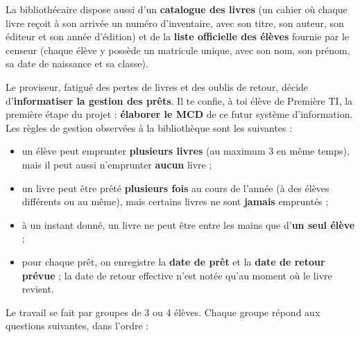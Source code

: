 \documentclass[11pt]{article}
\newcounter{popsec}
\newcounter{popsub}
\newcommand{\courssub}[1]{%
  \stepcounter{popsub}%
  \par\vspace{9pt}\noindent{\popxbold\fontsize{11.5}{13}\selectfont\color{popink}{\color{poporange}\thepopsec.\thepopsub}\hspace{6pt}#1}\par\nopagebreak\vspace{4pt}
}
\begin{document}
La bibliothécaire dispose aussi d'un \textbf{catalogue des livres} (un cahier où chaque livre reçoit à son arrivée un numéro d'inventaire, avec son titre, son auteur, son éditeur et son année d'édition) et de la \textbf{liste officielle des élèves} fournie par le censeur (chaque élève y possède un matricule unique, avec son nom, son prénom, sa date de naissance et sa classe).

Le proviseur, fatigué des pertes de livres et des oublis de retour, décide d'\textbf{informatiser la gestion des prêts}. Il te confie, à toi élève de Première TI, la première étape du projet : \textbf{élaborer le MCD} de ce futur système d'information. Les règles de gestion observées à la bibliothèque sont les suivantes :

\begin{itemize}
\item un élève peut emprunter \textbf{plusieurs livres} (au maximum 3 en même temps), mais il peut aussi n'emprunter \textbf{aucun} livre ;
\item un livre peut être prêté \textbf{plusieurs fois} au cours de l'année (à des élèves différents ou au même), mais certains livres ne sont \textbf{jamais} empruntés ;
\item à un instant donné, un livre ne peut être entre les mains que d'\textbf{un seul élève} ;
\item pour chaque prêt, on enregistre la \textbf{date de prêt} et la \textbf{date de retour prévue} ; la date de retour effective n'est notée qu'au moment où le livre revient.
\end{itemize}

\courssub{Consignes}

Le travail se fait par groupes de 3 ou 4 élèves. Chaque groupe répond aux questions suivantes, dans l'ordre :
\end{document}
